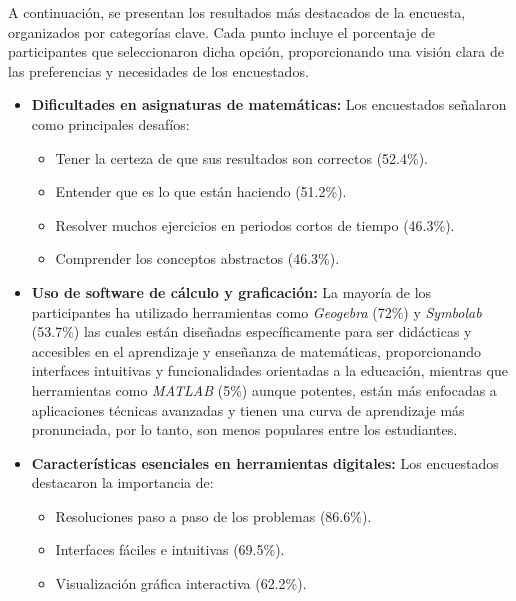 A continuación, se presentan los resultados más destacados de la encuesta, organizados por categorías clave. Cada punto incluye el porcentaje de participantes que seleccionaron dicha opción, proporcionando una visión clara de las preferencias y necesidades de los encuestados.
\begin{itemize}
	\item \textbf{Dificultades en asignaturas de matemáticas:} 
	Los encuestados señalaron como principales desafíos:
	\begin{itemize}
		\item Tener la certeza de que sus resultados son correctos (52.4\%).
		\item Entender que es lo que están haciendo (51.2\%).
		\item Resolver muchos ejercicios en periodos cortos de tiempo (46.3\%).
		\item Comprender los conceptos abstractos (46.3\%).
	\end{itemize}
	
	\item \textbf{Uso de software de cálculo y graficación:} 
	La mayoría de los participantes ha utilizado herramientas como \textit{Geogebra} (72\%) y \textit{Symbolab} (53.7\%) las cuales están diseñadas específicamente para ser didácticas y accesibles en el aprendizaje y enseñanza de matemáticas, proporcionando interfaces intuitivas y funcionalidades orientadas a la educación, mientras que herramientas como \textit{MATLAB} (5\%) aunque potentes, están más enfocadas a aplicaciones técnicas avanzadas y tienen una curva de aprendizaje más pronunciada, por lo tanto, son menos populares entre los estudiantes.
	
	\item \textbf{Características esenciales en herramientas digitales:} 
	Los encuestados destacaron la importancia de:
	\begin{itemize}
		\item Resoluciones paso a paso de los problemas (86.6\%).
		\item Interfaces fáciles e intuitivas (69.5\%).
		\item Visualización gráfica interactiva (62.2\%).
	\end{itemize}
	

\end{itemize}
